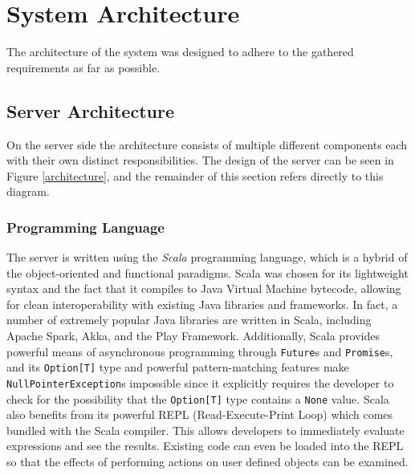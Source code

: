 \documentclass{l4proj}
\newcommand{\code}[1]{\texttt{#1}}
\begin{document}
    

\chapter{System Architecture}

The architecture of the system was designed to adhere to the gathered requirements as far as possible. 

    \section{Server Architecture}
    
On the server side the architecture consists of multiple different components each with their own distinct responsibilities. The design of the server can be seen in Figure \ref{architecture}, and the remainder of this section refers directly to this diagram.

    
    \subsection{Programming Language}
            The server is written using the \textit{Scala} programming language, which is a hybrid of the object-oriented and functional paradigms. Scala was chosen for its lightweight syntax and the fact that it compiles to Java Virtual Machine bytecode, allowing for clean interoperability with existing Java libraries and frameworks. In fact, a number of extremely popular Java libraries are written in Scala, including Apache Spark, Akka, and the Play Framework. Additionally, Scala provides powerful means of asynchronous programming through \code{Future}s and \code{Promise}s, and its \code{Option[T]} type and powerful pattern-matching features make \code{NullPointerException}s impossible since it explicitly requires the developer to check for the possibility that the \code{Option[T]} type contains a \code{None} value. Scala also benefits from its powerful REPL (Read-Execute-Print Loop) which comes bundled with the Scala compiler. This allows developers to immediately evaluate expressions and see the results. Existing code can even be loaded into the REPL so that the effects of performing actions on user defined objects can be examined.
            
\end{document}
